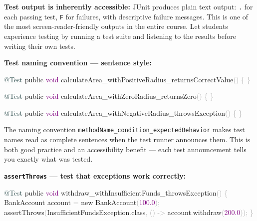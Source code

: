 \documentclass[
  justified,
  openright,
]{tufte-book}
\newcommand{\AttributeTok}[1]{\textcolor{DarkSlateGray}{#1}}
\newcommand{\DataTypeTok}[1]{\textcolor{Purple}{#1}}
\newcommand{\FloatTok}[1]{\textcolor{Purple}{#1}}
\newcommand{\FunctionTok}[1]{\textcolor{BrandBlue}{#1}}
\newcommand{\KeywordTok}[1]{\textcolor{BrandBlue}{#1}}
\newcommand{\NormalTok}[1]{#1}
\newcommand{\OperatorTok}[1]{\textcolor{DarkGray}{#1}}
\newenvironment{Shaded}{%
  \begin{snugshade}
}{%
  \end{snugshade}
}
\begin{document}
\textbf{Test output is inherently accessible:} JUnit produces plain text
output: \texttt{.} for each passing test, \texttt{F} for failures, with
descriptive failure messages. This is one of the most
screen-reader-friendly outputs in the entire course. Let students
experience testing by running a test suite and listening to the results
before writing their own tests.

\textbf{Test naming convention --- sentence style:}

\begin{Shaded}
\begin{Highlighting}[]
\AttributeTok{@Test}
\KeywordTok{public} \DataTypeTok{void} \FunctionTok{calculateArea\_withPositiveRadius\_returnsCorrectValue}\OperatorTok{()} \OperatorTok{\{} \OperatorTok{\}}

\AttributeTok{@Test}
\KeywordTok{public} \DataTypeTok{void} \FunctionTok{calculateArea\_withZeroRadius\_returnsZero}\OperatorTok{()} \OperatorTok{\{} \OperatorTok{\}}

\AttributeTok{@Test}
\KeywordTok{public} \DataTypeTok{void} \FunctionTok{calculateArea\_withNegativeRadius\_throwsException}\OperatorTok{()} \OperatorTok{\{} \OperatorTok{\}}
\end{Highlighting}
\end{Shaded}

The naming convention \texttt{methodName\_condition\_expectedBehavior}
makes test names read as complete sentences when the test runner
announces them. This is both good practice and an accessibility benefit
--- each test announcement tells you exactly what was tested.

\textbf{\texttt{assertThrows} --- test that exceptions work correctly:}

\begin{Shaded}
\begin{Highlighting}[]
\AttributeTok{@Test}
\KeywordTok{public} \DataTypeTok{void} \FunctionTok{withdraw\_withInsufficientFunds\_throwsException}\OperatorTok{()} \OperatorTok{\{}
\NormalTok{    BankAccount account }\OperatorTok{=} \KeywordTok{new} \FunctionTok{BankAccount}\OperatorTok{(}\FloatTok{100.0}\OperatorTok{);}
    \FunctionTok{assertThrows}\OperatorTok{(}\NormalTok{InsufficientFundsException}\OperatorTok{.}\FunctionTok{class}\OperatorTok{,} \OperatorTok{()} \OperatorTok{{-}\textgreater{}}\NormalTok{ account}\OperatorTok{.}\FunctionTok{withdraw}\OperatorTok{(}\FloatTok{200.0}\OperatorTok{));}
\OperatorTok{\}}
\end{Highlighting}
\end{Shaded}
\end{document}
